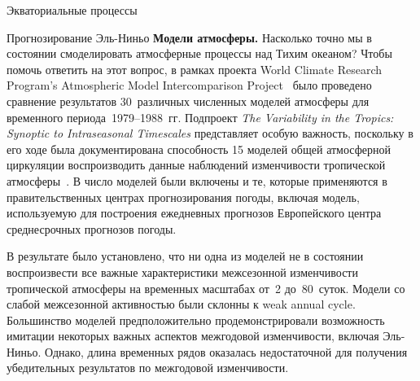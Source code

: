 \begin{chapter}{Экваториальные процессы}
\begin{section}{Прогнозирование Эль-Ниньо}
\textbf{Модели атмосферы.} Насколько точно мы в состоянии смоделировать
атмосферные процессы%
%
 над Тихим океаном? Чтобы помочь ответить
на этот вопрос, в рамках проекта World Climate Research Program's Atmospheric 
Model Intercomparison Project~\cite{Gates:1992} было проведено сравнение 
результатов 30~различных численных моделей атмосферы для временного 
периода~1979--1988~гг. 
Подпроект \emph{The Variability in the Tropics: Synoptic to Intraseasonal 
Timescales} представляет особую важность, поскольку в его ходе была 
документирована способность 15 моделей общей атмосферной циркуляции 
воспроизводить данные наблюдений изменчивости тропической 
атмосферы~\cite{Slingo:1995}. 
В число моделей были включены и те, которые применяются
в правительственных центрах прогнозирования погоды, включая модель,
используемую для построения ежедневных прогнозов Европейского центра
среднесрочных прогнозов погоды.
%

В результате было установлено, что ни одна из моделей не в состоянии 
воспроизвести все важные характеристики межсезонной изменчивости тропической
атмосферы на временных масштабах от~2 до~80~суток. Модели со слабой
межсезонной активностью были склонны к weak annual cycle. Большинство моделей
предположительно продемонстрировали возможность имитации некоторых важных
аспектов межгодовой изменчивости, включая Эль-Ниньо. Однако, длина временных
рядов оказалась недостаточной для получения убедительных результатов по
межгодовой изменчивости.
%


\end{section}
\end{chapter}
